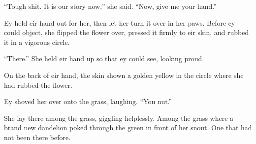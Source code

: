 ``Tough shit. It is our story now,'' she said. ``Now, give me your hand.''

Ey held eir hand out for her, then let her turn it over in her paws. Before ey could object, she flipped the flower over, pressed it firmly to eir skin, and rubbed it in a vigorous circle.

``There.'' She held eir hand up so that ey could see, looking proud.

On the back of eir hand, the skin shown a golden yellow in the circle where she had rubbed the flower.

Ey shoved her over onto the grass, laughing. ``You nut.''

She lay there among the grass, giggling helplessly. Among the grass where a brand new dandelion poked through the green in front of her snout. One that had not been there before.
